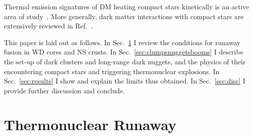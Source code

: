 \documentclass[
    twocolumn,
	prd,
        amssymb,
	preprintnumbers,
	secnumarabic,
	nofootinbib,
	superscriptaddress]{revtex4-1}
\begin{document}
Thermal emission signatures of DM heating compact stars kinetically is an active area of study~\cite{NSvIR:Baryakhtar:DKHNS,NSvIR:Raj:DKHNSOps,NSvIR:SelfIntDM,NSvIR:Bell2018:Inelastic,NSvIR:GaraniGenoliniHambye,NSvIR:Queiroz:Spectroscopy,NSvIR:Bell2019:Leptophilic,NSvIR:Hamaguchi:RotochemicalvDM2019,NSvIR:GaraniHeeck:Muophilic,NSvIR:Pasta,NSvIR:Riverside:LeptophilicShort,NSvIR:Marfatia:DarkBaryon,NSvIR:Riverside:LeptophilicLong,NSvIR:Bell:Improved,NSvIR:DasguptaGuptaRay:LightMed,NSvIR:GaraniGuptaRaj:Thermalizn,NSvIR:Bell:ImprovedLepton,NSvIR:Bell2020improved,NSvIR:Queiroz:BosonDM,NSvIR:anzuiniBell2021improved,NSvIR:Lin2021:spin1med,NSvIR:zeng2021PNGBDM,NSvIR:HamaguchiEWmultiplet:2022uiq,NsvIR:HamaguchiMug-2:2022wpz,NSvIR:IISc2022,NSvIR:PseudoscaTRIUMF:2022eav,NSvIR:InelasticJoglekarYu:2023fjj,globularGaraniRajReynosoC:2023esk,snowmass:Berti:2022rwn}. 
More generally, dark matter interactions with compact stars are extensively reviewed in Ref.~\cite{reviewdarkincompact}.



This paper is laid out as follows.
In Sec.~\ref{sec:boomphysics} I review the conditions for runaway fusion in WD cores and NS crusts.
In Sec.~\ref{sec:clumpsnuggetsbooms} I describe the set-up of dark clusters and long-range dark nuggets, and the physics of their encountering compact stars and triggering thermonuclear explosions.
In Sec.~\ref{sec:results} I show and explain the limits thus obtained.
In Sec.~\ref{sec:disc} I provide further discussion and conclude.

\section{Thermonuclear Runaway}
\label{sec:boomphysics}
\end{document}
